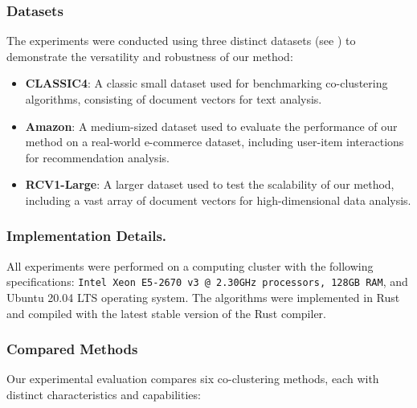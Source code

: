 \documentclass[journal]{IEEEtran}
\begin{document}
\subsubsection{Datasets}
The experiments were conducted using three distinct datasets (see ) to demonstrate the versatility and robustness of our method:
\begin{itemize}
    \item \textbf{CLASSIC4}: A classic small dataset used for benchmarking co-clustering algorithms, consisting of document vectors for text analysis.
    \item \textbf{Amazon}: A medium-sized dataset used to evaluate the performance of our method on a real-world e-commerce dataset, including user-item interactions for recommendation analysis.
    \item \textbf{RCV1-Large}: A larger dataset used to test the scalability of our method, including a vast array of document vectors for high-dimensional data analysis.
\end{itemize}

\subsubsection{Implementation Details.}
All experiments were performed on a computing cluster with the following specifications: \texttt{Intel Xeon E5-2670 v3 @ 2.30GHz processors, 128GB RAM}, and Ubuntu 20.04 LTS operating system. The algorithms were implemented in Rust and compiled with the latest stable version of the Rust compiler.

\subsubsection{Compared Methods}
Our experimental evaluation compares six co-clustering methods, each with distinct characteristics and capabilities:
\end{document}
